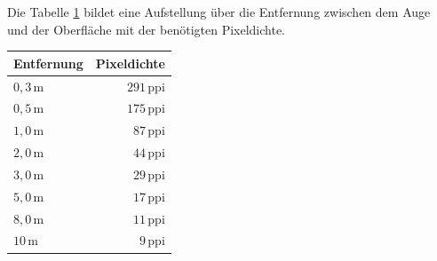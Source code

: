 Die Tabelle \ref{tab:Aufloessung} bildet eine Aufstellung über die Entfernung zwischen dem Auge und der Oberfläche mit der benötigten Pixeldichte.
\begin{table}[hbt]	
	\centering
	\renewcommand{\arraystretch}{1.5}	%
	\label{tab:Aufloessung}
	\begin{tabular}{l|r}
		\parbox[t]{0.2\linewidth}{\centering Entfernung} & \parbox[t]{0.2\linewidth}{\centering Pixeldichte}  \\
		\hline 
		\hline 
		$ 0,3\,\mathrm{m} $ & $ 291\,\mathrm{ppi} $ \\
		$ 0,5\,\mathrm{m} $ & $ 175\,\mathrm{ppi} $ \\
		$ 1,0\,\mathrm{m} $ & $ 87\,\mathrm{ppi} $ \\
		$ 2,0\,\mathrm{m} $ & $ 44\,\mathrm{ppi} $ \\
		$ 3,0\,\mathrm{m} $ & $ 29\,\mathrm{ppi} $ \\
		$ 5,0\,\mathrm{m} $ & $ 17\,\mathrm{ppi} $ \\
		$ 8,0\,\mathrm{m} $ & $ 11\,\mathrm{ppi} $ \\
		$ 10\,\mathrm{m} $ & $ 9\,\mathrm{ppi} $ \\
	\end{tabular} 
\end{table}
